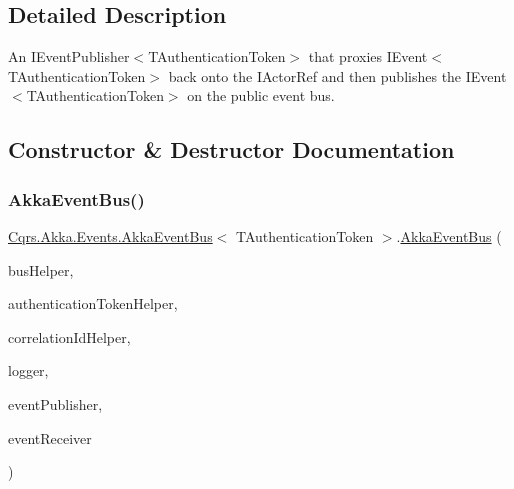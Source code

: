 \subsection{Detailed Description}
An I\+Event\+Publisher$<$\+T\+Authentication\+Token$>$ that proxies I\+Event$<$\+T\+Authentication\+Token$>$ back onto the I\+Actor\+Ref and then publishes the I\+Event$<$\+T\+Authentication\+Token$>$ on the public event bus. 



\subsection{Constructor \& Destructor Documentation}
\mbox{\label{classCqrs_1_1Akka_1_1Events_1_1AkkaEventBus_ab1f292c21b5516a89fdcc019deb04063_ab1f292c21b5516a89fdcc019deb04063}} 
\subsubsection{\texorpdfstring{Akka\+Event\+Bus()}{AkkaEventBus()}}
{\footnotesize\ttfamily \hyperlink{classCqrs_1_1Akka_1_1Events_1_1AkkaEventBus}{Cqrs.\+Akka.\+Events.\+Akka\+Event\+Bus}$<$ T\+Authentication\+Token $>$.\hyperlink{classCqrs_1_1Akka_1_1Events_1_1AkkaEventBus}{Akka\+Event\+Bus} (\begin{DoxyParamCaption}\item[{\hyperlink{interfaceCqrs_1_1Bus_1_1IBusHelper}{I\+Bus\+Helper}}]{bus\+Helper,  }\item[{\hyperlink{interfaceCqrs_1_1Authentication_1_1IAuthenticationTokenHelper}{I\+Authentication\+Token\+Helper}$<$ T\+Authentication\+Token $>$}]{authentication\+Token\+Helper,  }\item[{I\+Correlation\+Id\+Helper}]{correlation\+Id\+Helper,  }\item[{I\+Logger}]{logger,  }\item[{\hyperlink{interfaceCqrs_1_1Events_1_1IEventPublisher}{I\+Event\+Publisher}$<$ T\+Authentication\+Token $>$}]{event\+Publisher,  }\item[{\hyperlink{interfaceCqrs_1_1Events_1_1IEventReceiver}{I\+Event\+Receiver}$<$ T\+Authentication\+Token $>$}]{event\+Receiver }\end{DoxyParamCaption})}



